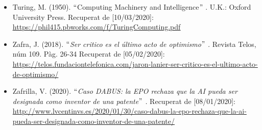 \documentclass[12pt]{article}
\renewcommand{\_}{\kern-1.5pt\textunderscore\kern-1.5pt}
\begin{document}
\begin{itemize}
\begin{itemize}
\vspace{\baselineskip}
	\item Turing, M. (1950). $``$Computing Machinery and Intelligence$"$ . U.K.: Oxford University Press. Recuperat de [10/03/2020]: \href{https://phil415.pbworks.com/f/TuringComputing.pdf}{\textcolor[HTML]{0000FF}{\ul{https://phil415.pbworks.com/f/TuringComputing.pdf}}}\par


\vspace{\baselineskip}
	\item Zafra, J. (2018). \textit{$``$Ser critico es el último acto de optimismo$"$ . }Revista Telos, núm 109. Pàg. 26-34 Recuperat de [05/02/2020]: \href{https://telos.fundaciontelefonica.com/jaron-lanier-ser-critico-es-el-ultimo-acto-de-optimismo/}{https://telos.fundaciontelefonica.com/jaron-lanier-ser-critico-es-el-ultimo-acto-de-optimismo/}\par


\vspace{\baselineskip}
	\item Zafrilla, V. (2020). $``$\textit{Caso DABUS: la EPO rechaza que la AI pueda ser designada como inventor de una patente$"$ .} Recuperat de [08/01/2020]: \href{http://www.lvcentinvs.es/2020/01/30/caso-dabus-la-epo-rechaza-que-la-ai-pueda-ser-designada-como-inventor-de-una-patente/}{http://www.lvcentinvs.es/2020/01/30/caso-dabus-la-epo-rechaza-que-la-ai-pueda-ser-designada-como-inventor-de-una-patente/}
\end{itemize}\par


\vspace{\baselineskip}

\vspace{\baselineskip}

\vspace{\baselineskip}

\vspace{\baselineskip}

\vspace{\baselineskip}

\vspace{\baselineskip}

\vspace{\baselineskip}

\vspace{\baselineskip}

\vspace{\baselineskip}

\vspace{\baselineskip}


\end{itemize}
\end{document}
